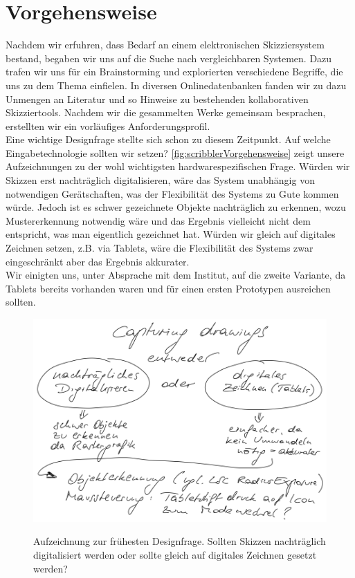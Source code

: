 \section{Vorgehensweise}
Nachdem wir erfuhren, dass Bedarf an einem elektronischen Skizziersystem bestand, begaben wir uns auf die Suche nach vergleichbaren Systemen. Dazu trafen wir uns für ein Brainstorming und explorierten verschiedene Begriffe, die uns zu dem Thema einfielen. In diversen Onlinedatenbanken fanden wir zu dazu Unmengen an Literatur und so Hinweise zu bestehenden kollaborativen Skizziertools. Nachdem wir die gesammelten Werke gemeinsam besprachen, erstellten wir ein vorläufiges Anforderungsprofil. \\
Eine wichtige Designfrage stellte sich schon zu diesem Zeitpunkt. Auf welche Eingabetechnologie sollten wir setzen? \autoref{fig:scribblerVorgehensweise} zeigt unsere Aufzeichnungen zu der wohl wichtigsten hardwarespezifischen Frage. Würden wir Skizzen erst nachträglich digitalisieren, wäre das System unabhängig von notwendigen Gerätschaften, was der Flexibilität des Systems zu Gute kommen würde. Jedoch ist es schwer gezeichnete Objekte nachträglich zu erkennen, wozu Mustererkennung notwendig wäre und das Ergebnis vielleicht nicht dem entspricht, was man eigentlich gezeichnet hat. Würden wir gleich auf digitales Zeichnen setzen, z.B. via Tablets, wäre die Flexibilität des Systems zwar eingeschränkt aber das Ergebnis akkurater. \\
Wir einigten uns, unter Absprache mit dem Institut, auf die zweite Variante, da Tablets bereits vorhanden waren und für einen ersten Prototypen ausreichen sollten.

\begin{figure}
	        {\includegraphics[width=1\linewidth]{gfx/scribblerVorgehensweise}}
		\caption[Aufzeichnung zur frühesten Designfrage]{Aufzeichnung zur frühesten Designfrage. Sollten Skizzen nachträglich digitalisiert werden oder sollte gleich auf digitales Zeichnen gesetzt werden?}\label{fig:scribblerVorgehensweise}
\end{figure}

